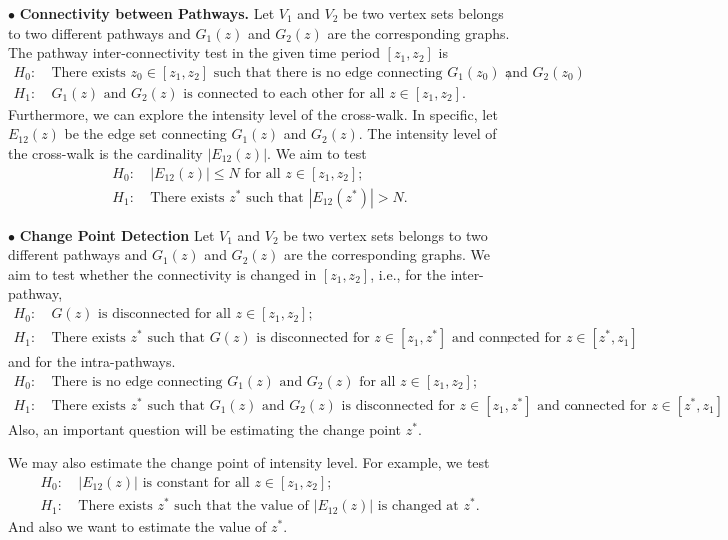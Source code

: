 \documentclass[11pt]{article}
\begin{document}
\noindent$\bullet$ {\bf Connectivity between Pathways.} Let $V_1$ and $V_2$ be two vertex sets  belongs to two different pathways and $G_1(z)$ and $G_2(z)$ are the corresponding graphs. The pathway inter-connectivity test in the given time period $[z_1, z_2]$ is
\begin{align*}
   H_0:~ &\text{There exists $z_0 \in [z_1, z_2]$ such that there is no edge connecting $G_1(z_0)$ and $G_2(z_0)$};\\
   H_1:~ &\text{$G_1(z)$ and $G_2(z)$ is connected to each other for all $z \in [z_1, z_2]$}.
\end{align*}
Furthermore, we can explore the intensity level of the cross-walk. In specific, let $E_{12}(z)$ be the edge set connecting $G_1(z)$ and $G_2(z)$. The intensity level of the cross-walk is the cardinality $|E_{12}(z)|$. We aim to test 
\begin{align*}
   H_0:~ &{|E_{12}(z)| \le N \text{ for all }  z \in [z_1, z_2]};\\
   H_1:~ &\text{There exists $z^*$ such that $|E_{12}(z^*)| > N$}.
\end{align*}

\noindent$\bullet$ {\bf Change Point Detection} Let $V_1$ and $V_2$ be two vertex sets  belongs to two different pathways and $G_1(z)$ and $G_2(z)$ are the corresponding graphs. We aim to test whether the connectivity is changed in $[z_1, z_2]$, i.e., for the inter-pathway,
\begin{align*}
   H_0:~ &\text{$G(z)$ is disconnected for all $z \in [z_1, z_2]$};\\
   H_1:~ &\text{There exists $z^*$ such that $G(z)$ is disconnected for $z \in [z_1, z^*]$ and connected for $z \in [z^*, z_1]$};
\end{align*}
and for the intra-pathways. 
\begin{align*}
   H_0:~ &\text{There is no edge connecting $G_1(z)$ and $G_2(z)$ for all $z \in [z_1, z_2]$};\\
   H_1:~ &\text{There exists $z^*$ such that $G_1(z)$ and $G_2(z)$ is disconnected for $z \in [z_1, z^*]$ and connected for $z \in [z^*, z_1]$}.
\end{align*}
Also, an important question will be estimating the change point $z^*$.

We may also estimate the change point of intensity level. For example, we test
\begin{align*}
   H_0:~ &\text{$|E_{12}(z)|$ is constant for all $z \in [z_1, z_2]$};\\
   H_1:~ &\text{There exists $z^*$ such that the value of $|E_{12}(z)|$ is changed at $z^*$}.
\end{align*}
And also we want to estimate the value of $z^*$.
\end{document}
